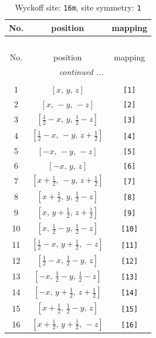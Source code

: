 \documentclass[fleqn,8pt]{jsarticle}
\begin{document}
\begin{longtable}{ccc}
\caption{Wyckoff site: {\tt 16m}, site symmetry: {\tt 1}}
 \\
 \hline \hline
No. & position & mapping \\ \hline \endfirsthead

\multicolumn{2}{l}{\tablename\ \thetable{}} \\
 \hline \hline
No. & position & mapping \\ \hline \endhead

 \hline \hline
\multicolumn{2}{r}{\footnotesize\it continued ...} \\ \endfoot

 \hline \hline
\multicolumn{2}{r}{} \\ \endlastfoot

1 & $\left[ x,\, y,\, z \right]$ & {\tt [1]} \\ \hline
2 & $\left[ x,\, - y,\, - z \right]$ & {\tt [2]} \\ \hline
3 & $\left[ \frac{1}{2} - x,\, y,\, \frac{1}{2} - z \right]$ & {\tt [3]} \\ \hline
4 & $\left[ \frac{1}{2} - x,\, - y,\, z + \frac{1}{2} \right]$ & {\tt [4]} \\ \hline
5 & $\left[ - x,\, - y,\, - z \right]$ & {\tt [5]} \\ \hline
6 & $\left[ - x,\, y,\, z \right]$ & {\tt [6]} \\ \hline
7 & $\left[ x + \frac{1}{2},\, - y,\, z + \frac{1}{2} \right]$ & {\tt [7]} \\ \hline
8 & $\left[ x + \frac{1}{2},\, y,\, \frac{1}{2} - z \right]$ & {\tt [8]} \\ \hline
9 & $\left[ x,\, y + \frac{1}{2},\, z + \frac{1}{2} \right]$ & {\tt [9]} \\ \hline
10 & $\left[ x,\, \frac{1}{2} - y,\, \frac{1}{2} - z \right]$ & {\tt [10]} \\ \hline
11 & $\left[ \frac{1}{2} - x,\, y + \frac{1}{2},\, - z \right]$ & {\tt [11]} \\ \hline
12 & $\left[ \frac{1}{2} - x,\, \frac{1}{2} - y,\, z \right]$ & {\tt [12]} \\ \hline
13 & $\left[ - x,\, \frac{1}{2} - y,\, \frac{1}{2} - z \right]$ & {\tt [13]} \\ \hline
14 & $\left[ - x,\, y + \frac{1}{2},\, z + \frac{1}{2} \right]$ & {\tt [14]} \\ \hline
15 & $\left[ x + \frac{1}{2},\, \frac{1}{2} - y,\, z \right]$ & {\tt [15]} \\ \hline
16 & $\left[ x + \frac{1}{2},\, y + \frac{1}{2},\, - z \right]$ & {\tt [16]} \\
\end{longtable}
\end{document}

